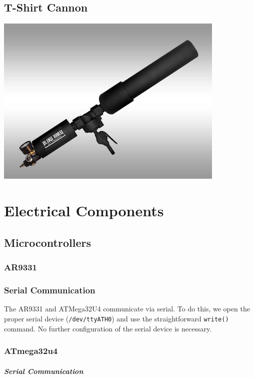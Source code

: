 \documentclass[letterpaper,12pt]{report}
\begin{document}
\section{T-Shirt Cannon}
\begin{center}
    \includegraphics[width=11cm]{pics/cannon/blowhard_cannon.jpg}
\end{center}

\chapter{Electrical Components}

\section{Microcontrollers}
\subsection{AR9331}

\subsection{Serial Communication}
\label{sec:ar9331_serial_com}
The AR9331 and ATMega32U4 communicate via serial. To do this, we open the proper
serial device (\texttt{/dev/ttyATH0}) and use the straightforward
\texttt{write()} command. No further configuration of the serial device is
necessary.

\subsection{ATmega32u4}

\paragraph{Serial Communication}
\label{sec:atmega_serial_com}
\end{document}
